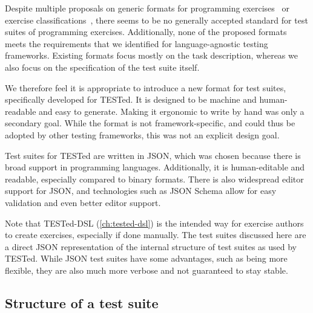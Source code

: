 \documentclass[../main]{subfiles}
\begin{document}
Despite multiple proposals on generic formats for programming exercises~\autocite{edwardsDevelopingCommonFormat2008a,paivaAnotherProgrammingExercises2020,queirosPexilProgrammingExercises2011,verhoeffProgrammingTaskPackages2008} or exercise classifications~\autocite{leOperationalizingContinuumWelldefined2013,simoesNatureProgrammingExercises2020}, there seems to be no generally accepted standard for test suites of programming exercises.
Additionally, none of the proposed formats meets the requirements that we identified for language-agnostic testing frameworks.
Existing formats focus mostly on the task description, whereas we also focus on the specification of the test suite itself.

We therefore feel it is appropriate to introduce a new format for test suites, specifically developed for TESTed.
It is designed to be machine and human-readable and easy to generate.
Making it ergonomic to write by hand was only a secondary goal.
While the format is not framework-specific, and could thus be adopted by other testing frameworks, this was not an explicit design goal.

Test suites for TESTed are written in JSON, which was chosen because there is broad support in programming languages.
Additionally, it is human-editable and readable, especially compared to binary formats.
There is also widespread editor support for JSON, and technologies such as JSON Schema allow for easy validation and even better editor support.

Note that TESTed-DSL (\cref{ch:tested-dsl}) is the intended way for exercise authors to create exercises, especially if done manually.
The test suites discussed here are a direct JSON representation of the internal structure of test suites as used by TESTed.
While JSON test suites have some advantages, such as being more flexible, they are also much more verbose and not guaranteed to stay stable.

\subsection{Structure of a test suite}\label{subsec:structure-of-a-test-suite}
\end{document}
